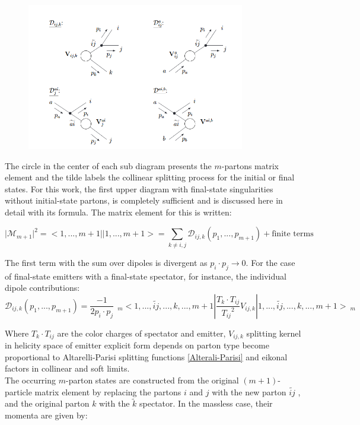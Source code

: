\begin{figure}[h!]
\centering
\includegraphics[width=0.85\textwidth]{images/Intro/Dipole.png}
\end{figure}

The circle in the center of each sub diagram presents the $m$-partons matrix element and the tilde labels the collinear splitting process for the initial or final states.
For this work, the first upper diagram with final-state singularities without initial-state partons, is completely sufficient and is discussed here in detail with its formula.
The matrix element for this is written:

\begin{equation}
\vert {{\mathcal{M}}}_{m+1}  \vert^2 = < 1,...,m+1 || 1,...,m+1 > = \sum_{k \neq i,j} {{\mathcal{D}}}_{ij,k}(p_1,...,p_{m+1}) +\text{finite terms}
\end{equation}

The first term with the sum over dipoles is divergent as $ p_i \cdot p_j \rightarrow 0 $. 
For the case of final-state emitters with a final-state spectator, for instance, the individual dipole contributions:
\begin{equation}
 {{\mathcal{D}}}_{ij,k}(p_1,...,p_{m+1}) = \frac{-1}{2p_i \cdot p_j} \:\:_m<1,...,\tilde{ij},...,k,...,m+1 |\frac{T_k \cdot T_{ij}}{{T_{ij}}^2} V_{ij,k}| 1,...,\tilde{ij},...,k,...,m+1 >\:_m
\end{equation}

Where $ T_k \cdot T_{ij} $ are the color charges of spectator and emitter, $ V_{ij,k} $ splitting kernel in helicity space of emitter
explicit form depends on parton type become proportional to Altarelli-Parisi splitting functions \ref{Alterali-Parisi} and eikonal factors
in collinear and soft limits.\\
The occurring $ m $-parton states are constructed from the original $(m+ 1)$-particle matrix element by replacing the partons $ i $ and $ j $ with the new parton $  \widetilde{ij} $ , and the original parton $ k $ with the $  \widetilde{k} $ spectator. In the massless case, their momenta are given by:

